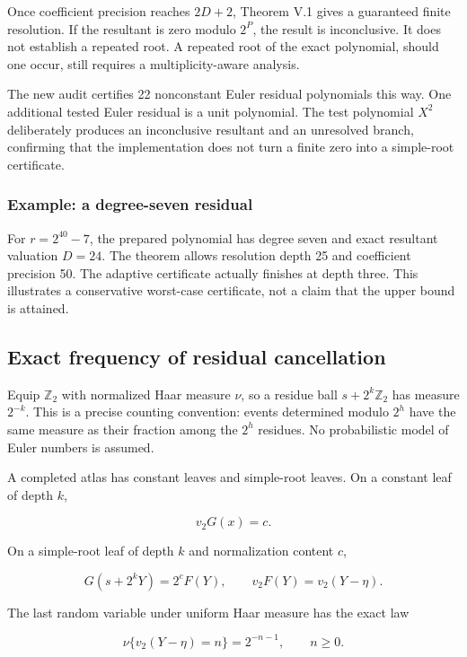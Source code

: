 \documentclass[11pt,letterpaper]{article}
\begin{document}
Once coefficient precision reaches \(2D+2\), Theorem V.1 gives a guaranteed finite resolution. If the resultant is zero modulo \(2^P\), the result is inconclusive. It does not establish a repeated root. A repeated root of the exact polynomial, should one occur, still requires a multiplicity-aware analysis.

The new audit certifies 22 nonconstant Euler residual polynomials this way. One additional tested Euler residual is a unit polynomial. The test polynomial \(X^2\) deliberately produces an inconclusive resultant and an unresolved branch, confirming that the implementation does not turn a finite zero into a simple-root certificate.

\subsubsection{Example: a degree-seven residual}\label{example-a-degree-seven-residual}

For \(r=2^{40}-7\), the prepared polynomial has degree seven and exact resultant valuation \(D=24\). The theorem allows resolution depth 25 and coefficient precision 50. The adaptive certificate actually finishes at depth three. This illustrates a conservative worst-case certificate, not a claim that the upper bound is attained.

\subsection{Exact frequency of residual cancellation}\label{exact-frequency-of-residual-cancellation}

Equip \(\mathbb Z_2\) with normalized Haar measure \(\nu\), so a residue ball \(s+2^k\mathbb Z_2\) has measure \(2^{-k}\). This is a precise counting convention: events determined modulo \(2^h\) have the same measure as their fraction among the \(2^h\) residues. No probabilistic model of Euler numbers is assumed.

A completed atlas has constant leaves and simple-root leaves. On a constant leaf of depth \(k\),

\[
v_2G(x)=c.
\]

On a simple-root leaf of depth \(k\) and normalization content \(c\),

\[
G(s+2^kY)=2^cF(Y),\qquad
v_2F(Y)=v_2(Y-\eta).
\]

The last random variable under uniform Haar measure has the exact law

\[
\nu\{v_2(Y-\eta)=n\}=2^{-n-1},\qquad n\ge0. \tag{V.3}
\]
\end{document}
